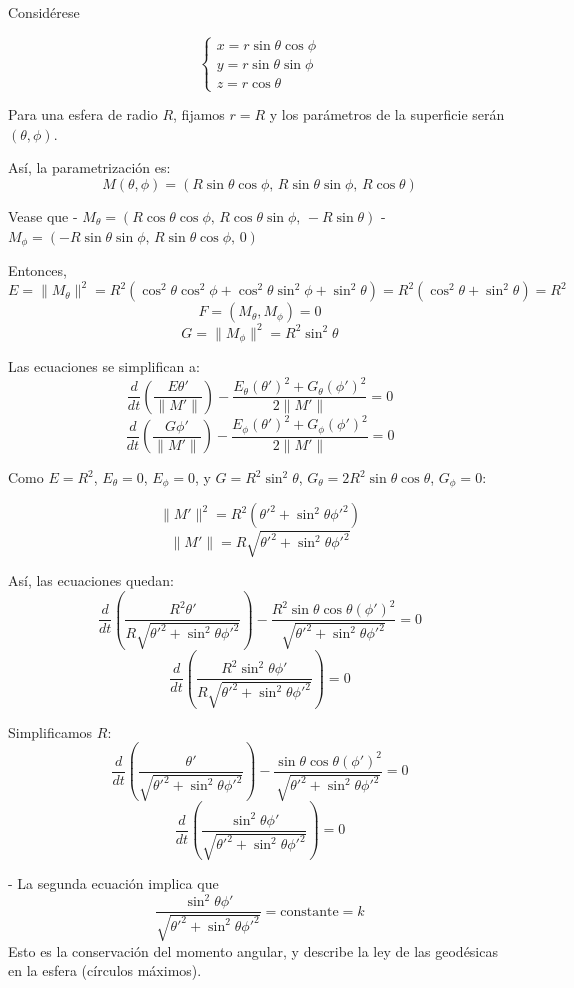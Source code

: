 \documentclass{article}
\theoremstyle{nonumberplain}
\begin{document}
Considérese

\[
\begin{cases}
x = r \sin \theta \cos \phi \\
y = r \sin \theta \sin \phi \\
z = r \cos \theta
\end{cases}
\]

Para una esfera de radio \( R \), fijamos \( r = R \) y los parámetros de la superficie serán \( (\theta, \phi) \).

Así, la parametrización es:
\[
M(\theta, \phi) = (R \sin \theta \cos \phi,\, R \sin \theta \sin \phi,\, R \cos \theta)
\]

Vease que
- \( M_\theta = (R \cos \theta \cos \phi,\, R \cos \theta \sin \phi,\, -R \sin \theta) \)
- \( M_\phi = (-R \sin \theta \sin \phi,\, R \sin \theta \cos \phi,\, 0) \)

Entonces,
\[
E = \|M_\theta\|^2 = R^2 (\cos^2\theta \cos^2\phi + \cos^2\theta \sin^2\phi + \sin^2\theta) = R^2 (\cos^2\theta + \sin^2\theta) = R^2
\]
\[
F = (M_\theta, M_\phi) = 0
\]
\[
G = \|M_\phi\|^2 = R^2 \sin^2\theta
\]

Las ecuaciones se simplifican a:
\[
\frac{d}{dt}\left(\frac{E \theta'}{\|M'\|}\right) - \frac{E_\theta (\theta')^2 + G_\theta (\phi')^2}{2\|M'\|} = 0
\]
\[
\frac{d}{dt}\left(\frac{G \phi'}{\|M'\|}\right) - \frac{E_\phi (\theta')^2 + G_\phi (\phi')^2}{2\|M'\|} = 0
\]

Como \( E = R^2 \), \( E_\theta = 0 \), \( E_\phi = 0 \), y \( G = R^2 \sin^2\theta \), \( G_\theta = 2R^2 \sin\theta \cos\theta \), \( G_\phi = 0 \):

\[
\|M'\|^2 = R^2 (\theta'^2 + \sin^2\theta \phi'^2)
\]
\[
\|M'\| = R \sqrt{\theta'^2 + \sin^2\theta \phi'^2}
\]

Así, las ecuaciones quedan:
\[
\frac{d}{dt}\left(\frac{R^2 \theta'}{R \sqrt{\theta'^2 + \sin^2\theta \phi'^2}}\right) - \frac{R^2 \sin\theta \cos\theta (\phi')^2}{\sqrt{\theta'^2 + \sin^2\theta \phi'^2}} = 0
\]
\[
\frac{d}{dt}\left(\frac{R^2 \sin^2\theta \phi'}{R \sqrt{\theta'^2 + \sin^2\theta \phi'^2}}\right) = 0
\]

Simplificamos \( R \):
\[
\frac{d}{dt}\left(\frac{ \theta'}{\sqrt{\theta'^2 + \sin^2\theta \phi'^2}}\right) - \frac{ \sin\theta \cos\theta (\phi')^2}{\sqrt{\theta'^2 + \sin^2\theta \phi'^2}} = 0
\]
\[
\frac{d}{dt}\left( \frac{ \sin^2\theta \phi'}{\sqrt{\theta'^2 + \sin^2\theta \phi'^2}} \right) = 0
\]

- La segunda ecuación implica que
  \[
  \frac{ \sin^2\theta \phi'}{\sqrt{\theta'^2 + \sin^2\theta \phi'^2}} = \text{constante} = k
  \]
  Esto es la conservación del momento angular, y describe la ley de las geodésicas en la esfera (círculos máximos). \\
\end{document}
